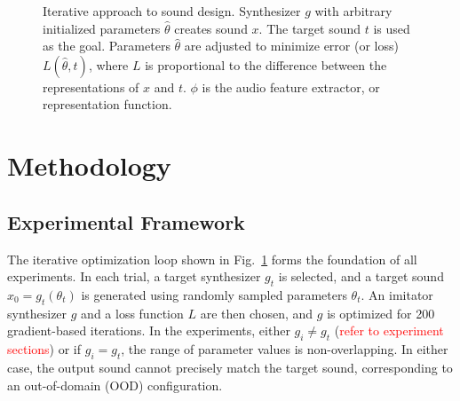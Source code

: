 \documentclass[runningheads]{llncs}
\newcommand{\todo}[1]{\textcolor{red}{#1}}
\begin{document}
\begin{figure}[ht]
    \centering
{}

\caption[Iterative approach to sound design.]{
Iterative approach to sound design. Synthesizer \(g\) with arbitrary initialized parameters \(\hat{\theta}\)
creates sound \(x\). The target sound \(t\) is used as the goal.
Parameters \(\hat{\theta}\) are adjusted to minimize error (or loss)
\(L(\hat{\theta},t)\), where \(L\) is proportional to the difference between
the representations of \(x\) and \(t\). \(\phi\) is the audio feature extractor, or representation function.
}
\label{fig:sound_design_loop_iterative}
\end{figure}



\section{Methodology}
\label{sec:experiment_setup}

\subsection{Experimental Framework}
The iterative optimization loop shown in Fig.~\ref{fig:sound_design_loop_iterative} forms the foundation of all experiments.  
In each trial, a target synthesizer $g_t$ is selected, and a target sound $x_0 = g_t(\theta_t)$ is generated using randomly sampled parameters $\theta_t$.  
An imitator synthesizer $g$ and a loss function $L$ are then chosen, and $g$ is optimized for 200 gradient-based iterations.  In the experiments, either $g_i \neq g_t$ (\todo{refer to experiment sections}) or if $g_i = g_t$, the range of parameter values is non-overlapping. In either case, the output sound cannot precisely match the target sound, corresponding to an out-of-domain (OOD) configuration.
\end{document}

